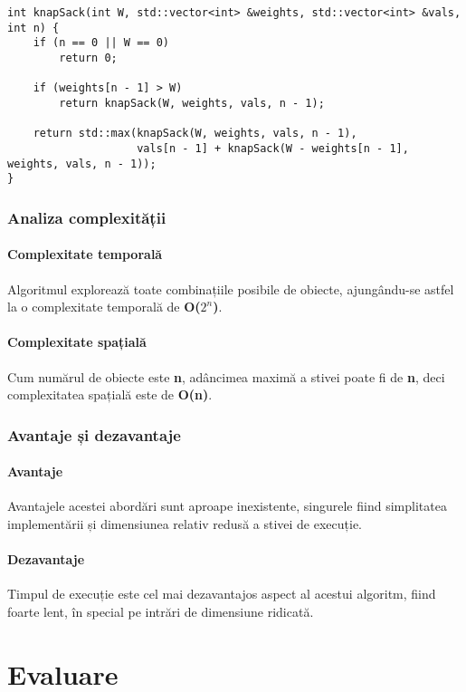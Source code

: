 \documentclass[runningheads]{llncs}
\begin{document}
\begin{lstlisting}
int knapSack(int W, std::vector<int> &weights, std::vector<int> &vals, int n) {
	if (n == 0 || W == 0)
		return 0;

	if (weights[n - 1] > W)
		return knapSack(W, weights, vals, n - 1);

	return std::max(knapSack(W, weights, vals, n - 1),
					vals[n - 1] + knapSack(W - weights[n - 1], weights, vals, n - 1));
}
\end{lstlisting}

\subsubsection{Analiza complexității}

\paragraph{Complexitate temporală} Algoritmul explorează toate combinațiile posibile de obiecte,
ajungându-se astfel la o complexitate temporală de \textbf{O($2^n$)}.

\paragraph{Complexitate spațială} Cum numărul de obiecte este \textbf{n}, adâncimea maximă
a stivei poate fi de \textbf{n}, deci complexitatea spațială este de \textbf{O(n)}.

\subsubsection{Avantaje și dezavantaje}

\paragraph{Avantaje} Avantajele acestei abordări sunt aproape inexistente, singurele fiind
simplitatea implementării și dimensiunea relativ redusă a stivei de execuție.

\paragraph{Dezavantaje} Timpul de execuție este cel mai dezavantajos aspect al acestui algoritm,
fiind foarte lent, în special pe intrări de dimensiune ridicată.

\section{Evaluare}
\end{document}
